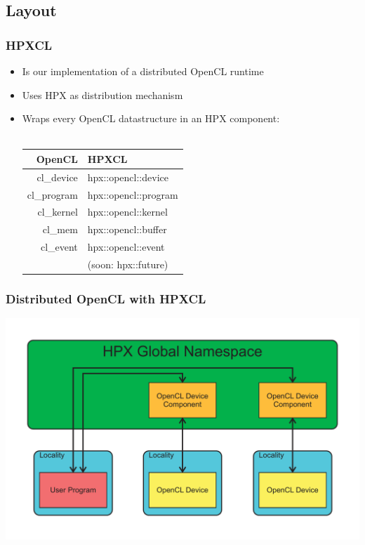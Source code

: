 \documentclass{beamer}
\begin{document}
\subsection{Layout}
\begin{frame}
    \frametitle{HPXCL}
    \begin{itemize}
        \item Is our implementation of a distributed OpenCL runtime
        \item Uses HPX as distribution mechanism
        \item Wraps every OpenCL datastructure in an HPX component:
            \\~\\
            \begin{tabular}{ r || l }
                OpenCL       & HPXCL                \\
                \hline
                cl\_device   & hpx::opencl::device  \\
                cl\_program  & hpx::opencl::program \\
                cl\_kernel   & hpx::opencl::kernel  \\
                cl\_mem      & hpx::opencl::buffer  \\
                cl\_event    & hpx::opencl::event   \\
                ~            & (soon: hpx::future)  \\
            \end{tabular}
    \end{itemize}
\end{frame}

\begin{frame}
    \frametitle{Distributed OpenCL with HPXCL}
    \begin{center}
        \includegraphics[width=\textwidth]{../2014-09-25_gputalk/hpx_opencl.pdf}
    \end{center}
\end{frame}
\end{document}
